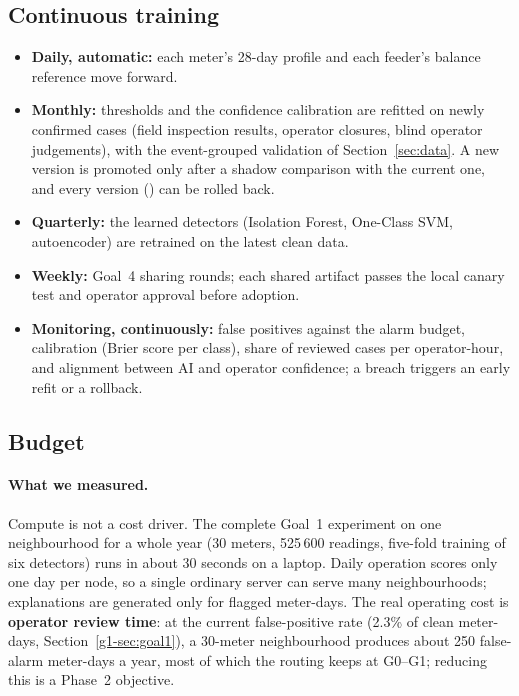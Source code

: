 \subsection{Continuous training}
\begin{itemize}
  \item \textbf{Daily, automatic:} each meter's 28-day profile and each feeder's balance reference move forward.
  \item \textbf{Monthly:} thresholds and the confidence calibration are refitted on newly confirmed cases (field
        inspection results, operator closures, blind operator judgements), with the event-grouped validation of
        Section~\ref{sec:data}. A new version is promoted only after a shadow comparison with the current one, and
        every version () can be rolled back.
  \item \textbf{Quarterly:} the learned detectors (Isolation Forest, One-Class SVM, autoencoder) are retrained on
        the latest clean data.
  \item \textbf{Weekly:} Goal~4 sharing rounds; each shared artifact passes the local canary test and operator
        approval before adoption.
  \item \textbf{Monitoring, continuously:} false positives against the alarm budget, calibration (Brier score per
        class), share of reviewed cases per operator-hour, and alignment between AI and operator confidence; a
        breach triggers an early refit or a rollback.
\end{itemize}

\subsection{Budget}
\paragraph{What we measured.} Compute is not a cost driver. The complete Goal~1 experiment on one neighbourhood
for a whole year (30 meters, 525\,600 readings, five-fold training of six detectors) runs in about 30 seconds on a
laptop. Daily operation scores only one day per node, so a single ordinary server can serve many neighbourhoods;
explanations are generated only for flagged meter-days. The real operating cost is \textbf{operator review time}:
at the current false-positive rate (2.3\% of clean meter-days, Section~\ref{g1-sec:goal1}), a 30-meter
neighbourhood produces about 250 false-alarm meter-days a year, most of which the routing keeps at G0--G1; reducing
this is a Phase~2 objective.

